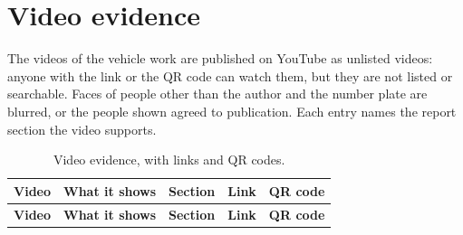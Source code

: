 \section{Video evidence}
\label{sec:video-evidence}

The videos of the vehicle work are published on YouTube as unlisted videos: anyone with the link or the QR code can watch them, but they are not listed or searchable. Faces of people other than the author and the number plate are blurred, or the people shown agreed to publication. Each entry names the report section the video supports.

\newcommand{\videoentry}[4]{#1 & #2 & #3 & \href{#4}{Watch} & \vspace{3pt}\qrcode[height=1.6cm]{#4}\vspace{2pt} \\ \hline\ignorespaces}
\begin{longtable}{|m{3.2cm}|m{5.6cm}|m{1.8cm}|m{1.1cm}|m{1.9cm}|}
\caption[Video evidence, with links and QR codes]{Video evidence, with links and QR codes.}\label{tab:video-evidence}\\
\hline
\textbf{Video} & \textbf{What it shows} & \textbf{Section} & \textbf{Link} & \textbf{QR code} \\ \hline
\endfirsthead
\hline
\textbf{Video} & \textbf{What it shows} & \textbf{Section} & \textbf{Link} & \textbf{QR code} \\ \hline
\endhead
%
\end{longtable}
